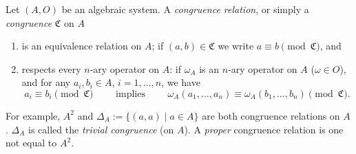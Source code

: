 \documentclass[12pt]{article}
\begin{document}
Let $(A,O)$ be an algebraic system.  A \emph{congruence relation}, or simply a \emph{congruence} $\mathfrak{C}$ on $A$ 
\begin{enumerate}
\item is an equivalence relation on $A$; if $(a,b)\in \mathfrak{C}$ we write $a\equiv b\pmod {\mathfrak{C}}$, and
\item respects every $n$-ary operator on $A$: if $\omega_A$ is an $n$-ary operator on $A$ ($\omega\in O$), and for any $a_i,b_i\in A$, $i=1,\ldots,n$, we have $$a_i\equiv b_i\pmod {\mathfrak{C}} \qquad\mbox{ implies }\qquad \omega_A(a_1,\ldots,a_n)\equiv \omega_A(b_1,\ldots,b_n) \pmod {\mathfrak{C}}.$$
\end{enumerate}

For example, $A^2$ and $\Delta_A:=\lbrace (a,a)\mid a\in A\rbrace$ are both congruence relations on $A$.  $\Delta_A$ is called the \emph{trivial congruence} (on $A$).  A \emph{proper} congruence relation is one not equal to $A^2$.
\end{document}
